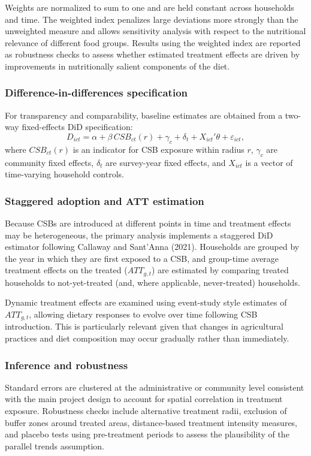 \documentclass{article}
\begin{document}
Weights are normalized to sum to one and are held constant across households and time. The weighted index penalizes large deviations more strongly than the unweighted measure and allows sensitivity analysis with respect to the nutritional relevance of different food groups. Results using the weighted index are reported as robustness checks to assess whether estimated treatment effects are driven by improvements in nutritionally salient components of the diet.

\subsubsection{Difference-in-differences specification}

For transparency and comparability, baseline estimates are obtained from a two-way fixed-effects DiD specification:
\[
D_{ict} = \alpha + \beta \, CSB_{ct}(r) + \gamma_c + \delta_t + X_{ict}'\theta + \varepsilon_{ict},
\]
where $CSB_{ct}(r)$ is an indicator for CSB exposure within radius $r$, $\gamma_c$ are community fixed effects, $\delta_t$ are survey-year fixed effects, and $X_{ict}$ is a vector of time-varying household controls.

\subsubsection{Staggered adoption and ATT estimation}

Because CSBs are introduced at different points in time and treatment effects may be heterogeneous, the primary analysis implements a staggered DiD estimator following Callaway and Sant’Anna (2021). Households are grouped by the year in which they are first exposed to a CSB, and group-time average treatment effects on the treated ($ATT_{g,t}$) are estimated by comparing treated households to not-yet-treated (and, where applicable, never-treated) households.

Dynamic treatment effects are examined using event-study style estimates of $ATT_{g,t}$, allowing dietary responses to evolve over time following CSB introduction. This is particularly relevant given that changes in agricultural practices and diet composition may occur gradually rather than immediately.

\subsubsection{Inference and robustness}

Standard errors are clustered at the administrative or community level consistent with the main project design to account for spatial correlation in treatment exposure. Robustness checks include alternative treatment radii, exclusion of buffer zones around treated areas, distance-based treatment intensity measures, and placebo tests using pre-treatment periods to assess the plausibility of the parallel trends assumption.
\end{document}
